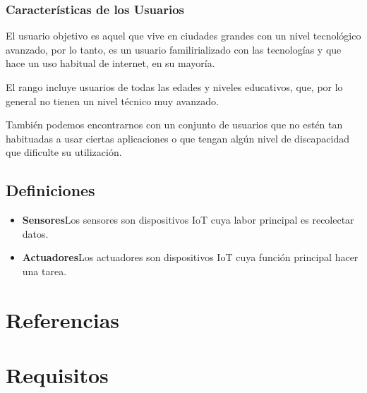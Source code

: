 \documentclass[12pt, a4paper, twoside]{article}
\newcommand\ttab{\tab \hspace{-5cm}}
\begin{document}
 \subsubsection{Características de los Usuarios}
 El usuario objetivo es aquel que vive en ciudades grandes con un nivel tecnológico avanzado,
 por lo tanto, es un usuario familirializado con las tecnologías y que hace un uso
 habitual de internet, en su mayoría.

 El rango incluye usuarios de todas las edades y niveles educativos, que, por lo general
 no tienen un nivel técnico muy avanzado.

 También podemos encontrarnos con un conjunto de usuarios que
 no estén tan habituadas a usar ciertas aplicaciones o que tengan algún nivel de discapacidad
 que dificulte su utilización.

\subsection{Definiciones}
\begin{itemize}
    \item \textbf{Sensores}\ttab Los sensores son dispositivos IoT cuya labor principal es recolectar datos.
    \item \textbf{Actuadores}\ttab Los actuadores son dispositivos IoT cuya función principal hacer una tarea.
\end{itemize}

\section{Referencias}

\section{Requisitos}
\end{document}
